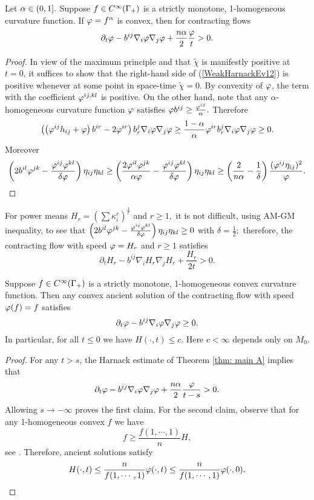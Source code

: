 \documentclass{amsart}
\begin{document}
\begin{theorem}\label{thm: main A}
Let $\alpha\in(0,1].$ Suppose $f\in C^{\infty}(\Gamma_+)$ is a strictly monotone, 1-homogeneous curvature function. If $\varphi=f^{\alpha}$ is convex, then for contracting flows
$$\partial_t \varphi-b^{ij}\nabla_i\varphi\nabla_j\varphi+\frac{n\alpha}{2}\frac{\varphi}{t}>0.$$
\end{theorem}
\begin{proof}
In view of the maximum principle and that $\tilde{\chi}$ is manifestly positive at $t=0$, it suffices to show that the right-hand side of (\ref{WeakHarnackEv12}) is positive whenever at some point in space-time $\tilde{\chi}=0$. By convexity of $\varphi$, the term with the coefficient $\varphi^{ij,kl}$ is positive. On the other hand, note that any $\alpha$-homogeneous curvature function $\varphi$ satisfies $\varphi b^{ij}\geq \frac{\varphi^{ij}}{\alpha}.$ Therefore
$$\left(\left(\varphi^{ij}h_{ij}+\varphi\right)b^{ir}-2\varphi^{ir}\right)b^{j}_{r}\nabla_{i}\varphi\nabla_{j}\varphi\ge \frac{1-\alpha}{\alpha}\varphi^{ir}b^{j}_{r}\nabla_{i}\varphi\nabla_{j}\varphi\ge 0.$$ Moreover
$$\left(2b^{il}\varphi^{jk}-\frac{\varphi^{ij}\varphi^{kl}}{\delta\varphi}\right)\eta_{ij}\eta_{kl}\geq \left(\frac{2\varphi^{il}\varphi^{jk}}{\alpha\varphi}-\frac{\varphi^{ij}\varphi^{kl}}{\delta\varphi}\right)\eta_{ij}\eta_{kl}\geq \left(\frac{2}{n\alpha}-\frac{1}{\delta}\right)\frac{(\varphi^{ij}\eta_{ij})^2}{\varphi}.$$
\end{proof}
\begin{remark}
For power means $H_r=\left(\sum \kappa_i^r\right)^{\frac{1}{r}}$ and $r\geq 1,$ it is not difficult, using AM-GM inequality, to see that $\left(2b^{il}\varphi^{jk}-\frac{\varphi^{ij}\varphi^{kl}}{\delta\varphi}\right)\eta_{ij}\eta_{kl}\geq0$ with $\delta=\frac{1}{2};$ therefore, the contracting flow with speed $\varphi=H_r$ and $r\geq 1$ satisfies 
$$\partial_t H_r-b^{ij}\nabla_iH_r\nabla_jH_r+\frac{H_r}{2t}>0.$$
\end{remark}
\begin{corollary}
\label{cor:boundedH}
Suppose $f\in C^{\infty}(\Gamma_+)$ is a strictly monotone, 1-homogeneous convex curvature function. Then any convex ancient solution of the contracting flow with speed $\varphi(f)=f$ satisfies
\[\partial_t \varphi-b^{ij}\nabla_i\varphi\nabla_j\varphi\geq 0.\]
In particular, for all $t\le 0$ we have
$H(\cdot,t)\leq c.$
Here $c<\infty$ depends only on $M_0.$
\end{corollary}
\begin{proof}
For any $t>s$, the  Harnack estimate of Theorem \ref{thm: main A} implies that
$$\partial_t \varphi-b^{ij}\nabla_i\varphi\nabla_j\varphi+\frac{n\alpha}{2}\frac{\varphi}{t-s}>0.$$
Allowing $s\to-\infty$ proves the first claim. For the second claim, observe that for any 1-homogeneous convex $f$ we have \[f\ge \frac{f(1,\cdots,1)}{n}H,\]
see \cite[Chapter 2]{Gerhardt:/2006}. Therefore, ancient solutions satisfy
\[H(\cdot,t)\leq \frac{n}{f(1,\cdots,1)}\varphi(\cdot,t)\leq \frac{n}{f(1,\cdots,1)}\varphi(\cdot,0). \]
\end{proof}
\end{document}
